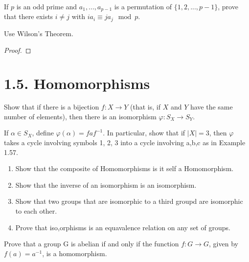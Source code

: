 \documentclass[15pt]{article}
\newenvironment{exercise}[2][Exercise]{\begin{trivlist}
\item[\hskip \labelsep {\bfseries #1}\hskip \labelsep {\bfseries #2.}]}
{\end{trivlist}}
\newenvironment{hint}[2][Hint]{\begin{trivlist}
    \item[\hskip \labelsep {\bfseries #1}\hskip \labelsep {\bfseries #2.}]}
    {\end{trivlist}}
\begin{document}
\begin{exercise}{1.45}
    If $p$ is an odd prime and $a_1,...,a_{p-1}$ is a permutation of $\{1,2,...,p-1\}$, prove that
    there exists $i \neq j$ with $ia_i \equiv ja_j \mod p$.
    \begin{hint}{}
        Use Wilson's Theorem.
    \end{hint}
\end{exercise}


\begin{proof}
    
\end{proof}





\section*{1.5.  Homomorphisms}


\begin{exercise}{1.46}

    Show that if there is a bijection $f: X\rightarrow Y$ (that is, if $X$ and $Y$ have the same number of elements),
    then there is an isomorphism $\varphi: S_X \rightarrow S_Y$.
    \begin{hint}{}
        If $\alpha \in S_X$, define $\varphi(\alpha) = faf^{-1}$. In particular, show that if $|X|=3$, then $\varphi$
        takes a cycle involving symbols 1, 2, 3 into a cycle involving a,b,c as in Example 1.57.
    \end{hint}
    
\end{exercise}




\begin{exercise}{1.47}
    \begin{enumerate}
        \item[(i)] Show that the composite of Homomorphisms is it self a Homomorphism.
        \item[(ii)] Show that the inverse of an isomorphism is an isomorphism.
        \item[(iii)] Show that two groups that are isomorphic to a third groupd are isomorphic to each other.
        \item[(iv)] Prove that iso,orphisms is an equavalence relation on any set of groups.
    \end{enumerate}
\end{exercise}


\begin{exercise}{1.48}
    Prove that a group G is abelian if and only if the function $f:G\rightarrow G$, given by $f(a) = a^{-1}$, 
    is a homomorphism.
\end{exercise}
\end{document}
